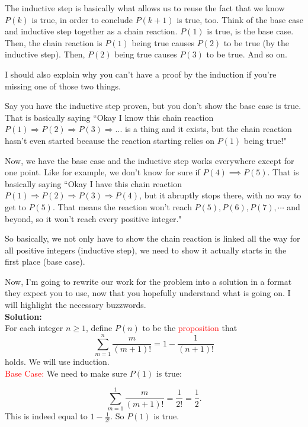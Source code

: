 \documentclass[11pt]{scrartcl}
\begin{document}
The inductive step is basically what allows us to reuse the fact that we know $P(k)$ is true, in order to conclude $P(k+1)$ is true, too. Think of the base case and inductive step together as a chain reaction. $P(1)$ is true, is the base case. Then, the chain reaction is $P(1)$ being true causes $P(2)$ to be true (by the inductive step). Then, $P(2)$ being true causes $P(3)$ to be true. And so on.

I should also explain why you can't have a proof by the induction if you're missing one of those two things.

Say you have the inductive step proven, but you don't show the base case is true. That is basically saying ``Okay I know this chain reaction $P(1) \Rightarrow P(2) \Rightarrow P(3) \Rightarrow ...$ is a thing and it exists, but the chain reaction hasn't even started because the reaction starting relies on $P(1)$ being true!"

Now, we have the base case and the inductive step works everywhere except for one point. Like for example, we don't know for sure if $P(4) \implies P(5)$. That is basically saying ``Okay I have this chain reaction $P(1) \Rightarrow P(2) \Rightarrow P(3) \Rightarrow P(4)$, but it abruptly stops there, with no way to get to $P(5)$. That means the reaction won't reach $P(5), P(6), P(7), \cdots$ and beyond, so it won't reach every positive integer."

So basically, we not only have to show the chain reaction is linked all the way for all positive integers (inductive step), we need to show it actually starts in the first place (base case).

Now, I'm going to rewrite our work for the problem into a solution in a format they expect you to use, now that you hopefully understand what is going on. I will highlight the necessary buzzwords. \\

\noindent
\textbf{Solution:} \\

For each integer $n \geq 1$, define $P(n)$ to be the \textcolor{red}{proposition} that \[\sum_{m=1}^{n}\frac{m}{(m+1)!} = 1 - \frac{1}{(n+1)!}\] holds. We will use induction.\\

\noindent
    \textcolor{red}{Base Case:} We need to make sure $P(1)$ is true:

    \[\sum_{m=1}^{1}\frac{m}{(m+1)!} = \frac{1}{2!} = \frac{1}{2}.\] This is indeed equal to $1 - \frac{1}{2!}$. So $P(1)$ is true. \\
\end{document}
